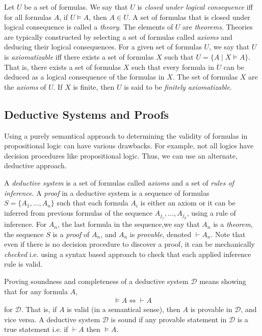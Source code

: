 \documentclass[10pt]{article}
\begin{document}
Let $U$ be a set of formulas. We say that $U$ is \textit{closed under logical consequence} iff for all formulas $A$, if $U \vDash A$, then $A \in U$. A set of formulas that is closed under logical consequence is called a \textit{theory}. The elements of $U$ are \textit{theorems}. Theories are typically constructed by selecting a set of formulas called \textit{axioms} and deducing their logical consequences. For a given set of formulas $U$, we say that $U$ is \textit{axiomatizable} iff there exists a set of formulas $X$ such that $U = \{A \mid X \vDash A\}$. That is, there exists a set of formulas $X$ such that every formula in $U$ can be deduced as a logical consequence of the formulas in $X$. The set of formulas $X$ are the \textit{axioms} of $U$. If $X$ is finite, then $U$ is said to be \textit{finitely axiomatizable}. 

\subsection{Deductive Systems and Proofs}

Using a purely semantical approach to determining the validity of formulas in propositional logic can have various drawbacks. For example, not all logics have decision procedures like propositional logic. Thus, we can use an alternate, deductive approach. 

A \textit{deductive system} is a set of formulas called \textit{axioms} and a set of \textit{rules of inference}. A \textit{proof} in a deductive system is a sequence of formulas $S = \{A_1,\dots,A_n\}$ such that each formula $A_i$ is either an axiom or it can be inferred from previous formulas of the sequence $A_{j_1},\dots,A_{j_k}$, using a rule of inference. For $A_n$, the last formula in the sequence,we say that $A_n$ is a \textit{theorem}, the sequence $S$ is a \textit{proof} of $A_n$, and $A_n$ is \textit{provable}, denoted $\vdash A_n$. Note that even if there is no decision procedure to discover a proof, it can be mechanically \textit{checked} i.e. using a syntax based approach to check that each applied inference rule is valid.

Proving soundness and completeness of a deductive system $\mathcal{D}$ means showing that for any formula $A$, 
\begin{align*}
    \vDash A \iff \vdash A  
\end{align*}
for $\mathcal{D}$. That is, if $A$ is valid (in a semantical sense), then $A$ is provable in $\mathcal{D}$, and vice versa. A deductive system $\mathcal{D}$ is sound if any provable statement in $\mathcal{D}$ is a true statement i.e. if $\vdash A$ then  $\vDash A$.
\end{document}
